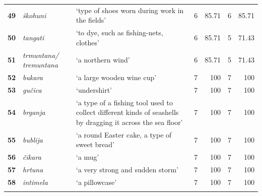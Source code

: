 \documentclass[output=paper]{LSP/langsci}
\begin{document}
\begin{table}
{\begin{tabular}{lp{2cm}p{5cm}lrlr}
{\bfseries 49} & {\itshape škohuni} & `type of shoes worn during work in the fields' & 6 & 85.71 & 6 & 85.71\\

{\bfseries 50} & {\itshape tangati} & `to dye, such as fishing-nets, clothes' & 6 & 85.71 & 5 & 71.43\\

{\bfseries 51} & {\itshape trmuntana/ tremuntana} & `a northern wind' & 6 & 85.71 & 5 & 71.43\\

{\bfseries 52} & {\itshape bukara} & `a large wooden wine cup' & 7 & 100 & 7 & 100\\

{\bfseries 53} & {\itshape gučica} & `undershirt' & 7 & 100 & 7 & 100\\

{\bfseries 54} & {\itshape brganja} & ‘a type of a fishing tool used to collect different kinds of seashells by dragging it across the sea floor’ & 7 & 100 & 7 & 100\\

{\bfseries 55} & {\itshape bublija} & `a round Easter cake, a type of sweet bread' & 7 & 100 & 7 & 100\\

{\bfseries 56} & {\itshape čikara} & `a mug' & 7 & 100 & 7 & 100\\

{\bfseries 57} & {\itshape hrtuna} & `a very strong and sudden storm' & 7 & 100 & 7 & 100\\

{\bfseries 58} & {\itshape intimela} & `a pillowcase' & 7 & 100 & 7 & 100\\
\lspbottomrule
\end{tabular}
}
\end{table}
\end{document}
